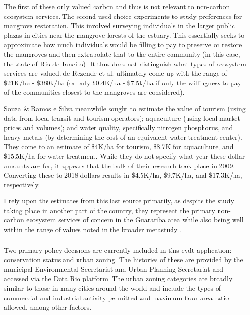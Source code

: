 The first of these only valued carbon and thus is not relevant to non-carbon ecosystem services.  The second used choice experiments to study preferences for mangrove restoration. This involved surveying individuals in the larger public plazas in cities near the mangrove forests of the estuary. This essentially seeks to approximate how much individuals would be filling to pay to preserve or restore the mangroves and then extrapolate that to the entire community (in this case, the state of Rio de Janeiro). It thus does not distinguish what types of ecosystem services are valued. de Rezende et al. ultimately come up with the range of \$21K/ha - \$380k/ha (or only \$0.4K/ha - \$7.5k/ha if only the willingness to pay of the communities closest to the mangroves are considered).

Souza \& Ramos e Silva meanwhile sought to estimate the value of tourism (using data from local transit and tourism operators); aquaculture (using local market prices and volumes); and water quality, specifically nitrogen phosphorus, and heavy metals (by determining the cost of an equivalent water treatment center). They come to an estimate of \$4K/ha for tourism, \$8.7K for aquaculture, and \$15.5K/ha for water treatment. While they do not specify what year these dollar amounts are for, it appears that the bulk of their research took place in 2009. Converting these to 2018 dollars results in \$4.5K/ha, \$9.7K/ha, and \$17.3K/ha, respectively.

I rely upon the estimates from this last source primarily, as despite the study taking place in another part of the country, they represent the primary non-carbon ecosystem services of concern in the Guaratiba area while also being well within the range of values noted in the broader metastudy \cite{jungGapsMangroveForestInReview}. 

\subsubsection{}

Two primary policy decisions are currently included in this \ac{evdt} application: conservation status and urban zoning. The histories of these are provided by the municipal Environmental Secretariat and Urban Planning Secretariat and accessed via the Data.Rio platform. The urban zoning categories are broadly similar to those in many cities around the world and include the types of commercial and industrial activity permitted and maximum floor area ratio allowed, among other factors. 

